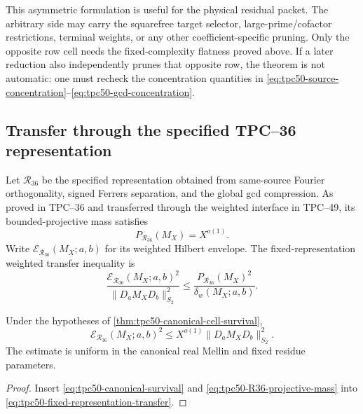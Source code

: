 This asymmetric formulation is useful for the physical residual
packet.  The arbitrary side may carry the squarefree target selector,
large-prime/cofactor restrictions, terminal weights, or any other
coefficient-specific pruning.  Only the opposite row cell needs the
fixed-complexity flatness proved above.  If a later reduction also
independently prunes that opposite row, the theorem is not automatic:
one must recheck the concentration quantities in
\eqref{eq:tpc50-source-concentration}--\eqref{eq:tpc50-gcd-concentration}.

\subsection{Transfer through the specified TPC--36 representation}

Let \(\mathscr R_{36}\) be the specified representation obtained from
same-source Fourier orthogonality, signed Ferrers separation, and the
global gcd compression.  As proved in TPC--36 and transferred through
the weighted interface in TPC--49, its bounded-projective mass satisfies
\citep{WangTPC36,WangTPC49}
\begin{equation}
 P_{\mathscr R_{36}}(M_X)=X^{o(1)}.
 \label{eq:tpc50-R36-projective-mass}
\end{equation}
Write \(\mathcal E_{\mathscr R_{36}}(M_X;a,b)\) for its weighted Hilbert
envelope.  The fixed-representation weighted transfer inequality is
\begin{equation}
 \frac{\mathcal E_{\mathscr R_{36}}(M_X;a,b)^2}
 {\|D_aM_XD_b\|_{S_2}^2}
 \leq
 \frac{P_{\mathscr R_{36}}(M_X)^2}
 {\delta_w(M_X;a,b)}.
 \label{eq:tpc50-fixed-representation-transfer}
\end{equation}

\begin{corollary}
\label{cor:tpc50-canonical-cell-transfer}
Under the hypotheses of
\cref{thm:tpc50-canonical-cell-survival},
\begin{equation}
 \boxed{
 \mathcal E_{\mathscr R_{36}}(M_X;a,b)^2
 \leq X^{o(1)}\|D_aM_XD_b\|_{S_2}^2.}
 \label{eq:tpc50-canonical-cell-atomic-transfer}
\end{equation}
The estimate is uniform in the canonical real Mellin and fixed residue
parameters.
\end{corollary}

\begin{proof}
Insert \eqref{eq:tpc50-canonical-survival} and
\eqref{eq:tpc50-R36-projective-mass} into
\eqref{eq:tpc50-fixed-representation-transfer}.
\end{proof}

